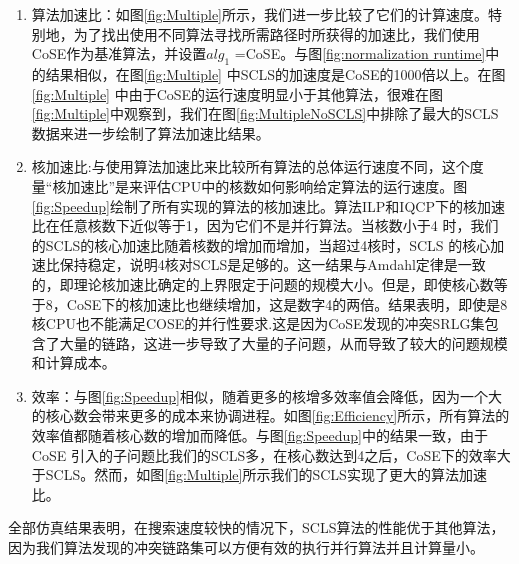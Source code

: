 \begin{enumerate}
   \item   算法加速比：如图\ref{fig:Multiple}所示，我们进一步比较了它们的计算速度。特别地，为了找出使用不同算法寻找所需路径时所获得的加速比，我们使用CoSE作为基准算法，并设置$alg_1$ =CoSE。与图\ref{fig:normalization runtime}中的结果相似，在图\ref{fig:Multiple} 中SCLS的加速度是CoSE的1000倍以上。在图\ref{fig:Multiple} 中由于CoSE的运行速度明显小于其他算法，很难在图\ref{fig:Multiple}中观察到，我们在图\ref{fig:MultipleNoSCLS}中排除了最大的SCLS 数据来进一步绘制了算法加速比结果。
   \item 核加速比:与使用算法加速比来比较所有算法的总体运行速度不同，这个度量“核加速比”是来评估CPU中的核数如何影响给定算法的运行速度。图\ref{fig:Speedup}绘制了所有实现的算法的核加速比。算法ILP和IQCP下的核加速比在任意核数下近似等于1，因为它们不是并行算法。当核数小于4 时，我们的SCLS的核心加速比随着核数的增加而增加，当超过4核时，SCLS 的核心加速比保持稳定，说明4核对SCLS是足够的。这一结果与Amdahl定律\cite{amdahl1967validity}是一致的，即理论核加速比确定的上界限定于问题的规模大小。但是，即使核心数等于8，CoSE下的核加速比也继续增加，这是数字4的两倍。结果表明，即使是8核CPU也不能满足COSE的并行性要求.这是因为CoSE发现的冲突SRLG集包含了大量的链路，这进一步导致了大量的子问题，从而导致了较大的问题规模和计算成本。
    \item 效率：与图\ref{fig:Speedup}相似，随着更多的核增多效率值会降低，因为一个大的核心数会带来更多的成本来协调进程。如图\ref{fig:Efficiency}所示，所有算法的效率值都随着核心数的增加而降低。与图\ref{fig:Speedup}中的结果一致，由于CoSE 引入的子问题比我们的SCLS多，在核心数达到4之后，CoSE下的效率大于SCLS。然而，如图\ref{fig:Multiple}所示我们的SCLS实现了更大的算法加速比。
\end{enumerate}

全部仿真结果表明，在搜索速度较快的情况下，SCLS算法的性能优于其他算法，因为我们算法发现的冲突链路集可以方便有效的执行并行算法并且计算量小。

